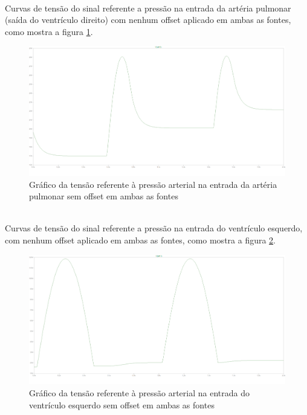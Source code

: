 \documentclass{abntex2}
\begin{document}
\\Curvas de tensão do sinal referente a pressão na entrada da artéria pulmonar (saída do ventrículo direito) com nenhum offset aplicado em ambas as fontes, como mostra a figura \ref{fig:pulmonar2}.

\begin{figure}[h]
  \centering
  \includegraphics[scale = 0.3]{pulmonar_v10_v20.png}
  \caption{Gráfico da tensão referente à pressão arterial na entrada da artéria pulmonar sem offset em ambas as fontes}
  \label{fig:pulmonar2}
\end{figure}
\pagebreak

\\Curvas de tensão do sinal referente a pressão na entrada do ventrículo esquerdo, com nenhum offset aplicado em ambas as fontes, como mostra a figura \ref{fig:ventriculo2}.

\begin{figure}[h]
  \centering
  \includegraphics[scale = 0.3]{ventriculo_esq_v10_v20.png}
  \caption{Gráfico da tensão referente à pressão arterial na entrada do ventrículo esquerdo sem offset em ambas as fontes}
  \label{fig:ventriculo2}
\end{figure}
\end{document}
